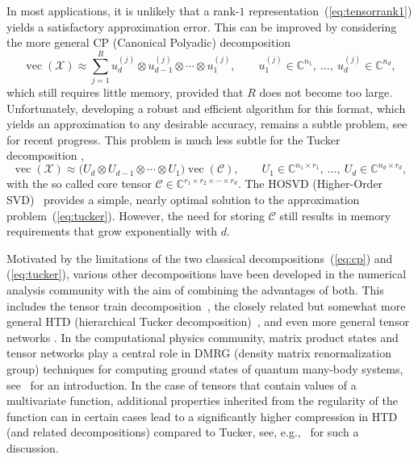 \documentclass[11pt, a4paper]{article}
\newcommand{\calC}{\mathcal{C}}
\newcommand{\calX}{\mathcal{X}}
\newcommand{\C}{{\mathbb C}}
\DeclareMathOperator{\vect}{vec}
\begin{document}
In most applications, it is unlikely that a rank-$1$ representation~(\ref{eq:tensorrank1}) yields a satisfactory
approximation error. This can be improved by considering the more general CP (Canonical Polyadic) decomposition \cite{Har70,CarC70}
\begin{equation} \label{eq:cp}
 \vect(\calX) \approx \sum_{j = 1}^R u^{(j)}_d \otimes u^{(j)}_{d-1} \otimes \cdots \otimes u^{(j)}_1, \qquad u^{(j)}_1 \in \C^{n_1},\ \ldots,\ u^{(j)}_d \in \C^{n_d},
\end{equation}
which still requires little memory, provided that $R$ does not become too large. Unfortunately,
developing a robust and efficient algorithm for this format, which yields an approximation to any desirable accuracy,
remains a subtle problem, see~\cite{AcaDK11,Espig2012d} for recent progress.
This problem is much less subtle for the Tucker decomposition \cite{Tucker66},
\begin{equation} \label{eq:tucker}
 \vect(\calX) \approx \big( U_d \otimes U_{d-1} \otimes \cdots \otimes U_1 \big) \vect(\calC), \qquad U_1 \in \C^{n_1\times r_1}, \ \ldots,\ U_d \in \C^{n_d\times r_d},
\end{equation}
with the so called core tensor $\calC\in \C^{r_1\times r_2 \times \cdots \times r_d}$.
The HOSVD (Higher-Order SVD)~\cite{DeLDV00} provides a simple, nearly optimal solution to the approximation
problem~(\ref{eq:tucker}). However, the need for storing $\calC$ still results in memory requirements that grow exponentially with $d$.

Motivated by the limitations of the two classical decompositions~(\ref{eq:cp}) and (\ref{eq:tucker}),
various other decompositions have been developed in the numerical analysis community with the aim
of combining the advantages of both. This includes the tensor train decomposition~\cite{KhoO09},
the closely related but somewhat more general HTD (hierarchical Tucker decomposition)~\cite{Gra10,HacK09}, and even more general tensor networks \cite{EspHHS11}.
In the computational physics community, matrix product states and tensor networks play a central role
in DMRG (density matrix renormalization group) techniques for computing ground states of quantum many-body systems, see~\cite{Sch11} for an introduction.
In the case of tensors that contain values of a multivariate function, additional properties inherited from the regularity of the function can in certain cases lead to a
significantly higher compression in HTD (and related decompositions) compared to Tucker, see, e.g.,~\cite{Hac12} for such a discussion.
\end{document}
